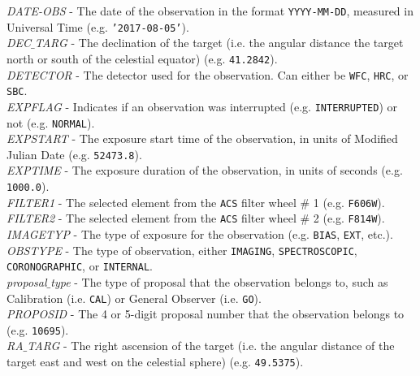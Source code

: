 \documentclass[10pt,journal,compsoc]{IEEEtran}
\begin{document}
\textit{DATE-OBS} - The date of the observation in the format \texttt{YYYY-MM-DD}, measured in Universal Time (e.g. \texttt{'2017-08-05'}).\\

\textit{DEC$\_$TARG} - The declination of the target (i.e. the angular distance the target north or south of the celestial equator) (e.g. \texttt{41.2842}).\\

\textit{DETECTOR} - The detector used for the observation.  Can either be \texttt{WFC}, \texttt{HRC}, or \texttt{SBC}.\\

\textit{EXPFLAG} - Indicates if an observation was interrupted (e.g. \texttt{INTERRUPTED}) or not (e.g. \texttt{NORMAL}).\\

\textit{EXPSTART} - The exposure start time of the observation, in units of Modified Julian Date (e.g. \texttt{52473.8}).\\

\textit{EXPTIME} - The exposure duration of the observation, in units of seconds (e.g. \texttt{1000.0}).\\

\textit{FILTER1} - The selected element from the \texttt{ACS} filter wheel \# 1 (e.g. \texttt{F606W}).\\

\textit{FILTER2} - The selected element from the \texttt{ACS} filter wheel \# 2 (e.g. \texttt{F814W}).\\

\textit{IMAGETYP} - The type of exposure for the observation (e.g. \texttt{BIAS}, \texttt{EXT}, etc.).\\

\textit{OBSTYPE} - The type of observation, either \texttt{IMAGING}, \texttt{SPECTROSCOPIC}, \texttt{CORONOGRAPHIC}, or \texttt{INTERNAL}.\\

\textit{proposal$\_$type} - The type of proposal that the observation belongs to, such as Calibration (i.e. \texttt{CAL}) or General Observer (i.e. \texttt{GO}).\\

\textit{PROPOSID} - The 4 or 5-digit proposal number that the observation belongs to (e.g. \texttt{10695}).\\

\textit{RA$\_$TARG} - The right ascension of the target (i.e. the angular distance of the target east and west on the celestial sphere) (e.g. \texttt{49.5375}).\\
\end{document}
